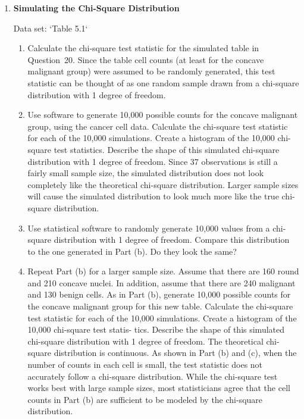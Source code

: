 \documentclass[
]{book}
\begin{document}
\begin{enumerate}
\begin{enumerate}
  $\bullet$ Calculate the chi-square statistic. If the observed frequencies are very different from the expected frequencies, the test       statistic will be large and we can reject the theoretical model.
  
  Note that we can never prove that the population actually follows a normal (or any other theoretical)
  model. We can only prove that a proposed model is wrong or fail to reject the model. Care should be
  taken not to state that we have proven that any population actually follows a particular distribution.

  \end{enumerate}

  \item \textbf{Simulating the Chi-Square Distribution}    

  Data set: `Table 5.1`    
  
  \begin{enumerate}
    \item Calculate the chi-square test statistic for the simulated table in Question 20. Since the table cell counts (at least for the concave malignant group) were assumed to be randomly generated, this test statistic can be thought of as one random sample drawn from a chi-square distribution with 1 degree of freedom.
    \item Use software to generate 10,000 possible counts for the concave malignant group, using the cancer cell data. Calculate the chi-square test statistic for each of the 10,000 simulations. Create a histogram of the 10,000 chi-square test statistics. Describe the shape of this simulated chi-square distribution with 1 degree of freedom. Since 37 observations is still a fairly small sample size, the simulated distribution does not look completely like the theoretical chi-square distribution. Larger sample sizes will cause the simulated distribution to look much more like the true chi-square distribution.
    \item Use statistical software to randomly generate 10,000 values from a chi-square distribution with 1 degree of freedom. Compare this distribution to the one generated in Part (b). Do they look the same?
    \item Repeat Part (b) for a larger sample size. Assume that there are 160 round and 210 concave nuclei. In
addition, assume that there are 240 malignant and 130 benign cells. As in Part (b), generate 10,000
possible counts for the concave malignant group for this new table. Calculate the chi-square test
statistic for each of the 10,000 simulations. Create a histogram of the 10,000 chi-square test statis-
tics. Describe the shape of this simulated chi-square distribution with 1 degree of freedom.
The theoretical chi-square distribution is continuous. As shown in Part (b) and (c), when the
number of counts in each cell is small, the test statistic does not accurately follow a chi-square
distribution. While the chi-square test works best with large sample sizes, most statisticians agree
that the cell counts in Part (b) are sufficient to be modeled by the chi-square distribution.
  \end{enumerate}
  

\end{enumerate}
\end{document}
